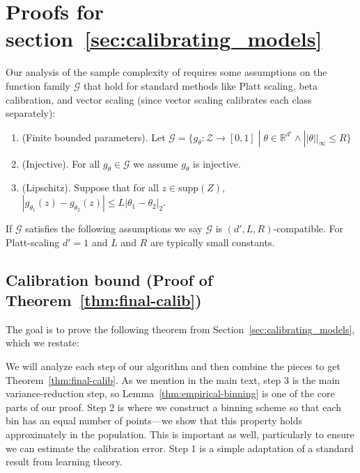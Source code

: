 \newpage
\section{Proofs for section~\ref{sec:calibrating_models}}
\label{sec:calibrating_models_appendix}

\newcommand{\G}[0]{\ensuremath{\mathcal{G}}}

Our analysis of the sample complexity of \ourcal{} requires some assumptions on the function family $\G{}$ that hold for standard methods like Platt scaling, beta calibration, and vector scaling (since vector scaling calibrates each class separately):

\begin{enumerate}
\item (Finite bounded parameters). Let $\G{} = \{ g_{\theta} : \mathcal{Z} \to [0, 1] \; | \; \theta \in \mathbb{R}^{d'} \wedge ||\theta||_{\infty} \leq R \}$
\item (Injective). For all $g_{\theta} \in \G{}$ we assume $g_{\theta}$ is injective.
\item (Lipschitz). Suppose that for all $z \in \mbox{supp}(Z)$, $|g_{\theta_1}(z) - g_{\theta_2}(z)| \leq L|\theta_1 - \theta_2|_2$.
\end{enumerate}

If $\G{}$ satisfies the following assumptions we say $\G{}$ is $(d', L, R)$-compatible. For Platt-scaling $d' = 1$ and $L$ and $R$ are typically small constants.



\subsection{Calibration bound (Proof of Theorem~\ref{thm:final-calib})}

The goal is to prove the following theorem from Section~\ref{sec:calibrating_models}, which we restate:

\finalCalib*{}


We will analyze each step of our algorithm and then combine the pieces to get Theorem~\ref{thm:final-calib}.
As we mention in the main text, step 3 is the main variance-reduction step, so Lemma~\ref{thm:empirical-binning} is one of the core parts of our proof.
Step 2 is where we construct a binning scheme so that each bin has an equal number of points---we show that this property holds approximately in the population.
This is important as well, particularly to ensure we can estimate the calibration error.
Step 1 is a simple adaptation of a standard result from learning theory.

